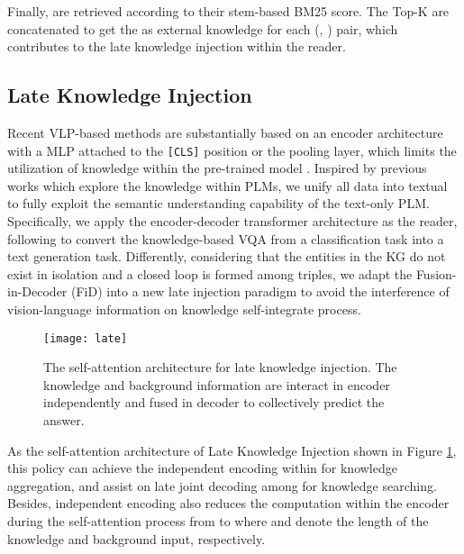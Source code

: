 \documentclass[sigconf]{acmart}
\newcommand{\cjy}[1]{{\color{black}#1}}
\begin{document}
Finally,   are retrieved according to their stem-based BM25 score. The Top-K  are concatenated to get the   as external knowledge for each (, ) pair, which contributes to the late knowledge injection within the reader.

\subsection{Late Knowledge Injection}
Recent VLP-based methods are substantially based on \cjy{an} encoder architecture  with a MLP attached \cjy{to} the {\tt [CLS]} position or the pooling layer, which limits the utilization of knowledge within the pre-trained model \citep{DBLP:conf/acl/GaoFC20}.
Inspired by previous works \citep{DBLP:conf/eacl/HeinzerlingI21,DBLP:conf/acl/CaoLHSYLXX20} \cjy{which explore the knowledge within PLMs}, we unify all data into textual to \cjy{fully} exploit the semantic understanding capability of the text-only PLM.
Specifically, we apply \cjy{the} encoder-decoder transformer architecture as the reader, following \citep{DBLP:conf/icml/ChoLTB21} to convert the knowledge-based VQA from a classification task into a text generation task.
Differently, considering that the entities in the KG do not exist in isolation and a closed loop is formed among triples, 
 we adapt the Fusion-in-Decoder (FiD) \citep{DBLP:conf/eacl/IzacardG21} into a new late injection paradigm to avoid the interference of vision-language information on knowledge self-integrate process.
 \begin{figure}[htbp]
 \vspace{-1mm}
  \texttt{[image: late]}
  \vspace{-1mm}
    \caption{The self-attention architecture for late knowledge injection. The knowledge and background information are interact in encoder independently and fused in decoder to collectively predict the answer.
    } 
  \label{fig:late}
\end{figure}
As the self-attention architecture of Late Knowledge Injection shown in Figure \ref{fig:late}, this policy can achieve the independent encoding within   for knowledge aggregation, and assist on late joint decoding among  for knowledge searching.
Besides, independent encoding also reduces the computation within the encoder during the self-attention process from  to  where  and  denote the length of the knowledge and background input, respectively. 
\end{document}
